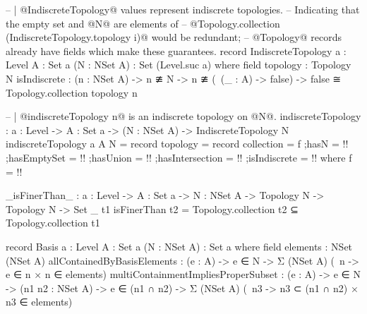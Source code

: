 \begin{code}
-- | @IndiscreteTopology@ values represent indiscrete topologies.
-- Indicating that the empty set and @N@ are elements of
-- @Topology.collection (IndiscreteTopology.topology i)@ would be redundant;
-- @Topology@ records already have fields which make these guarantees.
record IndiscreteTopology {a : Level}
                          {A : Set a}
                          (N : NSet A) : Set (Level.suc a) where
  field
    topology : Topology N
    isIndiscrete : (n : NSet A) ->
                   n ≇ N ->
                   n ≇ (\ (_ : A) -> false)
                   -> false ≅ Topology.collection topology n

-- | @indiscreteTopology n@ is an indiscrete topology on @N@.
indiscreteTopology : {a : Level} ->
                     {A : Set a} ->
                     (N : NSet A) ->
                     IndiscreteTopology N
indiscreteTopology {a} {A} N = record
  {topology = record
     {collection = f
     ;hasN = {!!}
     ;hasEmptySet = {!!}
     ;hasUnion = {!!}
     ;hasIntersection = {!!}
     }
  ;isIndiscrete = {!!}}
  where
  f = {!!}
  
_isFinerThan_ : {a : Level} ->
                {A : Set a} ->
                {N : NSet A} ->
                Topology N ->
                Topology N ->
                Set _
t1 isFinerThan t2 = Topology.collection t2 ⊆ Topology.collection t1

record Basis {a : Level} {A : Set a} (N : NSet A) : Set a where
  field
   elements : NSet (NSet A)
   allContainedByBasisElements :
     (e : A) ->
     e ∈ N ->
     Σ (NSet A) (\ n -> e ∈ n × n ∈ elements)
   multiContainmentImpliesProperSubset :
     (e : A) ->
     e ∈ N ->
     (n1 n2 : NSet A) ->
     e ∈ (n1 ∩ n2) ->
     Σ (NSet A) (\ n3 -> n3 ⊂ (n1 ∩ n2) × n3 ∈ elements)
\end{code}
